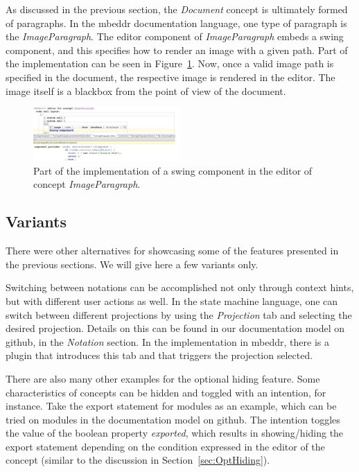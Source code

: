 \documentclass[preprint,numbers,10pt]{sigplanconf}
\begin{document}
As discussed in the previous section, the \emph{Document} concept is ultimately formed of paragraphs.
In the mbeddr documentation language, one type of paragraph is the \emph{ImageParagraph}. The editor
component of \emph{ImageParagraph} embeds a swing component, and this specifies how to render an image
with a given path. Part of the implementation can be seen in Figure~\ref{fig:EditorImageParagraph}.
Now, once a valid image path is specified in the document, the respective image
is rendered in the editor. The image itself is a blackbox from the point of view of the document.

\begin{figure}[H]
	\centering
	\includegraphics[width=0.50\textwidth]{screens/EditorImageParagraph.png}
	\caption{Part of the implementation of a swing component in the editor of concept \emph{ImageParagraph}.}
	\label{fig:EditorImageParagraph}
\end{figure}

\subsection{Variants}
There were other alternatives for showcasing some of the features presented in the previous sections.
We will give here a few variants only.

Switching between notations can be accomplished not only through context hints, but with
different user actions as well. In the state machine language, one can switch between different
projections by using the \emph{Projection} tab and selecting the desired projection. Details on this
can be found in our documentation model on github, in the \emph{Notation} section. In the implementation in mbeddr,
there is a plugin that introduces this tab and that triggers the projection selected.

There are also many other examples for the optional hiding feature. Some characteristics of concepts
can be hidden and toggled with an intention, for instance. Take the export statement for modules as an example, which can
be tried on modules in the documentation model on github. The intention toggles the value of the boolean property \emph{exported},
which results in showing/hiding the export statement depending on the condition expressed in the editor of the concept
(similar to the discussion in Section~\ref{sec:OptHiding}).
\end{document}
